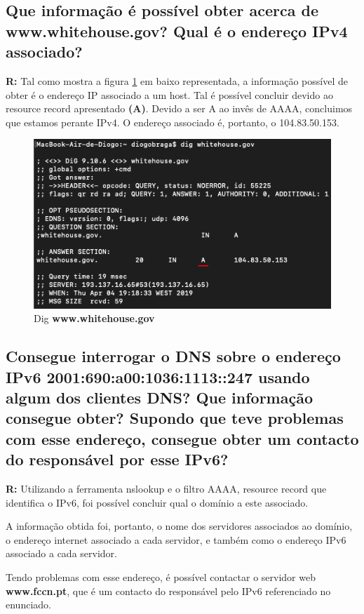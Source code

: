 \documentclass{llncs}
\begin{document}
\subsection{\textbf{Que informação é possível obter acerca de www.whitehouse.gov? Qual é o endereço IPv4 associado?}}
\textbf{R:} Tal como mostra a figura \ref{fig:8} em baixo representada, a informação possível de obter é o endereço IP associado a um host. Tal é possível concluir devido ao resource record apresentado \textbf{(A)}. Devido a ser A ao invês de AAAA, concluimos que estamos perante IPv4. O endereço associado é, portanto, o 104.83.50.153.

\begin{figure}[H]
\begin{center}
\includegraphics[scale=0.6]{8.png}
\end{center}
\caption{\label{fig:8}Dig \textbf{www.whitehouse.gov}}
\end{figure}


\subsection{\textbf{Consegue interrogar o DNS sobre o endereço IPv6 2001:690:a00:1036:1113::247 usando algum dos clientes DNS? Que informação consegue obter? Supondo que teve problemas com esse endereço, consegue obter um contacto do responsável por esse IPv6?}}
\textbf{R:} Utilizando a ferramenta nslookup e o filtro AAAA, resource record que identifica o IPv6, foi possível concluir qual o domínio a este associado.

A informação obtida foi, portanto, o nome dos servidores associados ao domínio, o endereço internet associado a cada servidor, e também como o endereço IPv6 associado a cada servidor.

Tendo problemas com esse endereço, é possível contactar o servidor web \textbf{www.fccn.pt}, que é um contacto do responsável pelo IPv6 referenciado no enunciado.
\end{document}
